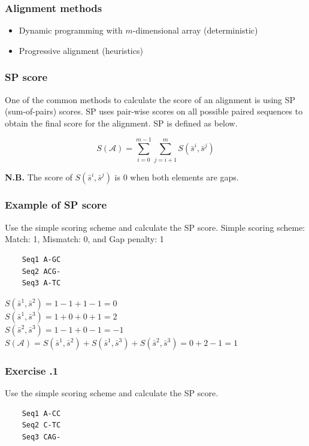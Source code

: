 %
%
\subsubsection*{Alignment methods} 

\begin{itemize}
\item Dynamic programming with $m$-dimensional array (deterministic)
\item Progressive alignment (heuristics)
\end{itemize}

%
%
\subsubsection*{SP score} 
One of the common methods to calculate the score of an alignment is using SP (sum-of-pairs) scores. SP uses pair-wise scores on all possible paired sequences to obtain the final score for the alignment. SP is defined as below.

\[
S(\mathcal{A}) = \sum_{i=0}^{m-1} \sum_{j=i+1}^{m} S(\bar{s}^i, \bar{s}^j)
\]

\textbf{N.B.} The score of $S(\bar{s}^i, \bar{s}^j)$ is 0 when both elements are gaps.

%
%
\subsubsection*{Example of SP score} 
Use the simple scoring scheme and calculate the SP score. Simple scoring scheme: Match: 1, Mismatch: 0, and Gap penalty: 1

\begin{verbatim}
    Seq1 A-GC
    Seq2 ACG-
    Seq3 A-TC
\end{verbatim}

\noindent
$S(\bar{s}^1, \bar{s}^2)=1-1+1-1=0$ \\
$S(\bar{s}^1, \bar{s}^3)=1+0+0+1=2$ \\
$S(\bar{s}^2, \bar{s}^3)=1-1+0-1=-1$ \\

\noindent
$S(\mathcal{A}) =S(\bar{s}^1, \bar{s}^2) + S(\bar{s}^1, \bar{s}^3) + S(\bar{s}^2, \bar{s}^3) = 0 + 2 - 1 = 1$

%
%
\subsubsection*{Exercise \thesection.1}
Use the simple scoring scheme and calculate the SP score.

\begin{verbatim}
    Seq1 A-CC
    Seq2 C-TC
    Seq3 CAG-
\end{verbatim}

\bigskip 

%
